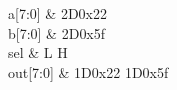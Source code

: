 \begin{tikztimingtable} [xscale=2.0]
	a[7:0] & 2D{0x22} \\
	b[7:0] & 2D{0x5f} \\
	sel & L H \\
	out[7:0] & 1D{0x22} 1D{0x5f} \\
\end{tikztimingtable}

